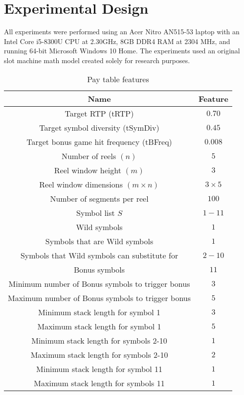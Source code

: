 \documentclass[conference]{IEEEtran}
\begin{document}
\section{Experimental Design}
\label{design}
All experiments were performed using an Acer Nitro AN515-53 laptop with an Intel Core i5-8300U CPU at 2.30GHz, 8GB DDR4 RAM at 2304 MHz, and running 64-bit Microsoft Windows 10 Home. The experiments used an original slot machine math model created solely for research purposes.
\begin{table}[htbp]
\caption{Pay table features}
\begin{center}
\begin{tabular}{|c|c|}
\hline
\textbf{Name}&\textbf{Feature} \\
\hline
Target RTP (tRTP) & $0.70$ \\
\hline
Target symbol diversity (tSymDiv) & $0.45$ \\
\hline
Target bonus game hit frequency (tBFreq) & $0.008$ \\
\hline
Number of reels $(n)$ & $5$ \\
\hline
Reel window height $(m)$ & $3$ \\
\hline
Reel window dimensions $(m\times n)$ & $3\times 5$ \\
\hline
Number of segments per reel & $100$ \\
\hline
Symbol list $S$ & $1-11$ \\
\hline
Wild symbols & $1$  \\
\hline
Symbols that are Wild symbols & $1$ \\
\hline
Symbols that Wild symbols can substitute for & $2-10$\\
\hline
Bonus symbols & $11$  \\
\hline
Minimum number of Bonus symbols to trigger bonus & $3$ \\
\hline
Maximum number of Bonus symbols to trigger bonus & $5$ \\
\hline
Minimum stack length for symbol 1 & $3$  \\
\hline
Maximum stack length for symbol 1 & $5$  \\
\hline
Minimum stack length for symbols 2-10 & $1$  \\
\hline
Maximum stack length for symbols 2-10 & $2$  \\
\hline
Minimum stack length for symbol 11 & $1$  \\
\hline
Maximum stack length for symbols 11 & $1$  \\
\hline
\end{tabular}
\label{paytableFeatures}
\end{center}
\end{table}
\end{document}
